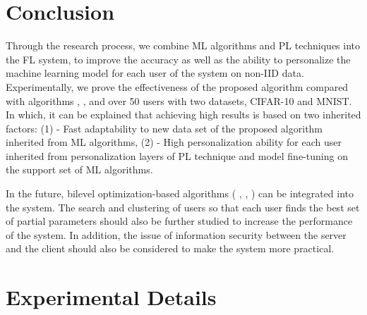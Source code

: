 \documentclass[runningheads]{llncs}
\begin{document}
\section{Conclusion}

Through the research process, we combine ML algorithms and PL techniques into the FL system, to improve the accuracy as well as the ability to personalize the machine learning model for each user of the system on non-IID data. Experimentally, we prove the effectiveness of the proposed algorithm  compared with algorithms , , and  over 50 users with two datasets, CIFAR-10 and MNIST. In which, it can be explained that achieving high results is based on two inherited factors: (1) - Fast adaptability to new data set of the proposed algorithm inherited from ML algorithms, (2) - High personalization ability for each user inherited from personalization layers of PL technique and model fine-tuning on the support set of ML algorithms.

In the future, bilevel optimization-based algorithms ( \cite{finn2017model},  \cite{rajeswaran2019meta}, ) can be integrated into the system. The search and clustering of users so that each user finds the best set of partial parameters should also be further studied to increase the performance of the system. In addition, the issue of information security between the server and the client should also be considered to make the system more practical.
\clearpage

%
%
%
%
%


\clearpage

\appendix
\section{Experimental Details}
\label{appendix}
\end{document}
